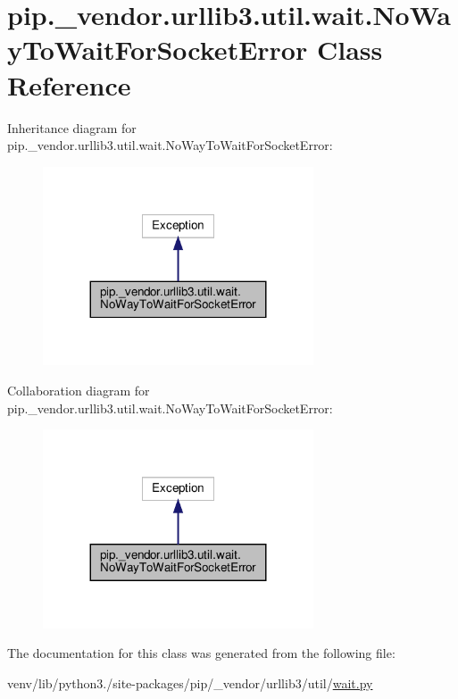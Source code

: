 \hypertarget{classpip_1_1__vendor_1_1urllib3_1_1util_1_1wait_1_1NoWayToWaitForSocketError}{}\section{pip.\+\_\+vendor.\+urllib3.\+util.\+wait.\+No\+Way\+To\+Wait\+For\+Socket\+Error Class Reference}
\label{classpip_1_1__vendor_1_1urllib3_1_1util_1_1wait_1_1NoWayToWaitForSocketError}


Inheritance diagram for pip.\+\_\+vendor.\+urllib3.\+util.\+wait.\+No\+Way\+To\+Wait\+For\+Socket\+Error\+:
\nopagebreak
\begin{figure}[H]
\begin{center}
\leavevmode
\includegraphics[width=227pt]{classpip_1_1__vendor_1_1urllib3_1_1util_1_1wait_1_1NoWayToWaitForSocketError__inherit__graph}
\end{center}
\end{figure}


Collaboration diagram for pip.\+\_\+vendor.\+urllib3.\+util.\+wait.\+No\+Way\+To\+Wait\+For\+Socket\+Error\+:
\nopagebreak
\begin{figure}[H]
\begin{center}
\leavevmode
\includegraphics[width=227pt]{classpip_1_1__vendor_1_1urllib3_1_1util_1_1wait_1_1NoWayToWaitForSocketError__coll__graph}
\end{center}
\end{figure}


The documentation for this class was generated from the following file\+:\begin{DoxyCompactItemize}
\item 
venv/lib/python3./site-\/packages/pip/\+\_\+vendor/urllib3/util/\hyperlink{urllib3_2util_2wait_8py}{wait.\+py}\end{DoxyCompactItemize}
